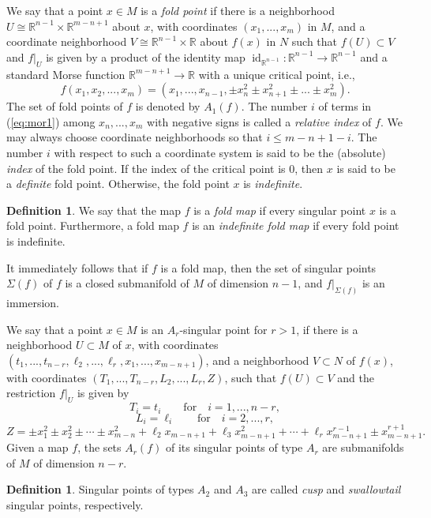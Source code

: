 \documentclass[12pt]{amsart}
\def \R{\mathbb{R}}
\def\co{\colon}
\def\id{\mathop\mathrm{id}}
\theoremstyle{definition}
\newtheorem{definition}[theorem]{Definition}
\begin{document}
We say that a point $x\in M$ is a \emph{fold point} if 
there is a neighborhood $U\cong \R^{n-1} \times \R^{m-n+1}$ about $x$,  with coordinates $(x_1,..., x_m)$ in $M$,  and a coordinate neighborhood $V\cong \R^{n-1}\times \R$ about $f(x)$ in $N$ such that $f(U)\subset V$ and $f|_U$ is given by a product of the identity map $\id_{\R^{n-1}}\co \R^{n-1}\to \R^{n-1}$ and a standard Morse function $\R^{m-n+1}\to \R$ with a unique critical point,  i.e., 
\begin{equation}\label{eq:mor1}
f(x_1,x_2, ..., x_m)=(x_1, ..., x_{n-1}, \pm x_n^2 \pm x_{n+1}^2\pm ... \pm x_{m}^2).
\end{equation}
 The set of fold  points of $f$ is denoted by $A_1(f)$. The number $i$ of terms in (\ref{eq:mor1}) among $x_n, ..., x_m$ with negative signs is called a \emph{relative index} of $f$.  
We may always choose coordinate neighborhoods so that $i\le m-n+1-i$. The number $i$ with respect to such a coordinate system is said to be the (absolute) \emph{index} of the fold point.  If the index of the critical point is $0$,  then  $x$ is said to be a \emph{definite} fold point. Otherwise, the fold point $x$ is \emph{indefinite}. 
\begin{definition}
We say that the map $f$ is a \emph{fold map} if every singular point $x$ is a fold point. Furthermore, a fold map $f$ is an \emph{indefinite fold map} if every fold point is indefinite. 
\end{definition}
\noindent It immediately follows that if $f$ is a fold map, then the set of singular points $\Sigma(f)$ of $f$ is a closed submanifold of $M$ of dimension $n-1$, and $f|_{\Sigma(f)}$ is an immersion. 

We say that a point $x\in M$ is an $A_r$-singular point for $r>1$, if there is a neighborhood $U\subset M$ of $x$,  with coordinates $(t_1,..., t_{n-r}, \ell_2, ..., \ell_r, x_1,..., x_{m-n+1})$,  and a neighborhood $V\subset N$ of $f(x)$,  with coordinates $(T_1,..., T_{n-r}, L_2,..., L_r, Z)$,  such that $f(U)\subset V$ and the restriction $f|_U$ is given by 
\[
    T_i=t_i \qquad \mathrm{for}\quad i=1, ..., n-r, 
\]
\[
   L_i=\ell_i \qquad \mathrm{for}\quad i=2, ..., r, 
\]
\[   
     Z= \pm x_1^2 \pm x_2^2 \pm \cdots \pm x_{m-n}^2 + \ell_2 x_{m-n+1} +  \ell_3 x_{m-n+1}^2 + \cdots + \ell_r x^{r-1}_{m-n+1} \pm  x^{r+1}_{m-n+1}. 
\]
Given a map $f$, the sets $A_r(f)$ of its singular points of type $A_r$  are submanifolds of $M$ of dimension $n-r$. 

\begin{definition}
Singular points of types $A_2$ and $A_3$ are called \emph{cusp} and \emph{swallowtail} singular points, respectively. 
\end{definition}
\end{document}
